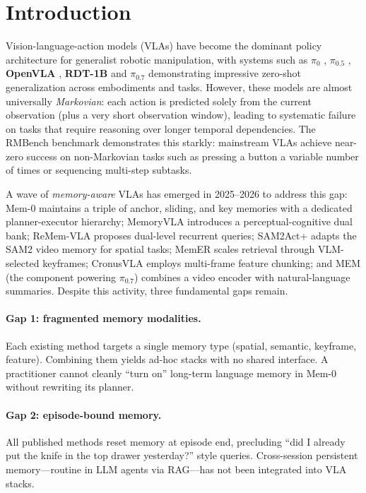 \section{Introduction}
\label{sec:intro}

Vision-language-action models (VLAs) have become the dominant policy
architecture for generalist robotic manipulation, with systems such as
\textbf{$\pi_0$} \cite{pi0}, \textbf{$\pi_{0.5}$} \cite{pi05},
\textbf{OpenVLA} \cite{openvla}, \textbf{RDT-1B} \cite{rdt1b} and
\textbf{$\pi_{0.7}$} \cite{pi07} demonstrating impressive zero-shot
generalization across embodiments and tasks. However, these models are
almost universally \emph{Markovian}: each action is predicted solely
from the current observation (plus a very short observation window),
leading to systematic failure on tasks that require reasoning over
longer temporal dependencies. The RMBench benchmark
\cite{rmbench} demonstrates this starkly: mainstream VLAs achieve
near-zero success on non-Markovian tasks such as pressing a button
a variable number of times or sequencing multi-step subtasks.

A wave of \emph{memory-aware} VLAs has emerged in 2025--2026 to
address this gap:
Mem-0 \cite{rmbench} maintains a triple of anchor, sliding, and key
memories with a dedicated planner-executor hierarchy;
MemoryVLA \cite{memoryvla} introduces a perceptual-cognitive dual bank;
ReMem-VLA \cite{rememvla} proposes dual-level recurrent queries;
SAM2Act+ \cite{sam2act} adapts the SAM2 video memory for spatial
tasks; MemER \cite{memer} scales retrieval through VLM-selected
keyframes; CronusVLA \cite{cronusvla} employs multi-frame feature
chunking; and MEM \cite{mem} (the component powering
$\pi_{0.7}$) combines a video encoder with natural-language
summaries. Despite this activity, three fundamental gaps remain.

\paragraph{Gap 1: fragmented memory modalities.}
Each existing method targets a single memory type (spatial, semantic,
keyframe, feature). Combining them yields ad-hoc stacks with no
shared interface. A practitioner cannot cleanly ``turn on'' long-term
language memory in Mem-0 without rewriting its planner.

\paragraph{Gap 2: episode-bound memory.}
All published methods reset memory at episode end, precluding
``did I already put the knife in the top drawer yesterday?'' style
queries. Cross-session persistent memory---routine in LLM agents via
RAG---has not been integrated into VLA stacks.

